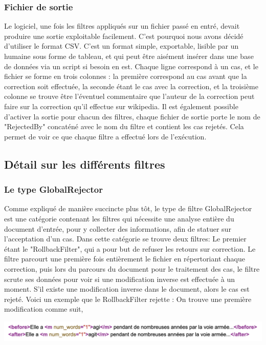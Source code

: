 \documentclass{article}
\begin{document}
\subsubsection{Fichier de sortie}
Le logiciel, une fois les filtres appliqu\'{e}s sur un fichier pass\'{e} en entr\'{e}, devait produire une sortie exploitable facilement. C'est pourquoi nous avons d\'{e}cid\'{e} d'utiliser le format CSV. C'est un format simple, exportable, lisible par un humaine sous forme de tableau, et qui peut \^{e}tre ais\'{e}ment ins\'{e}rer dans une base de donn\'{e}es via un script si besoin en est. Chaque ligne correspond \`{a} un cas, et le fichier se forme en trois colonnes : la premi\`{e}re correspond au cas avant que la correction soit effectu\'{e}e, la seconde \'{e}tant le cas avec la correction, et la troisi\`{e}me colonne se trouve \^{e}tre l'\'{e}ventuel commentaire que l'auteur de la correction peut faire sur la correction qu'il effectue sur wikipedia.
Il est \'{e}galement possible d'activer la sortie pour chacun des filtres, chaque fichier de sortie porte le nom de "RejectedBy" concat\'{e}n\'{e} avec le nom du filtre et contient les cas rejet\'{e}s. Cela permet de voir ce que chaque filtre a effectu\'{e} lors de l'ex\'{e}cution.

\subsection{D\'{e}tail sur les diff\'{e}rents filtres}
\subsubsection{Le type GlobalRejector}
Comme expliqu\'{e} de mani\`{e}re succincte plus t\^{o}t, le type de filtre GlobalRejector est une cat\'{e}gorie contenant les filtres qui n\'{e}cessite une analyse enti\`{e}re du document d'entr\'{e}e, pour y collecter des informations, afin de statuer sur l'acceptation d'un cas. 
	Dans cette cat\'{e}gorie se trouve deux filtres:
Le premier \'{e}tant le "RollbackFilter", qui a pour but de refuser les retours sur correction. Le filtre parcourt une premi\`{e}re fois enti\`{e}rement le fichier en r\'{e}pertoriant chaque correction, puis lors du parcours du document pour le traitement des cas, le filtre scrute ses donn\'{e}es pour voir si une modification inverse est effectu\'{e}e \`{a} un moment. S'il existe une modification inverse dans le document, alors le cas est rejet\'{e}.
Voici un exemple que le RollbackFilter rejette :
On trouve une premi\`{e}re modification comme suit,
\begin{center}
\includegraphics[width=14cm]{exemple10.png} %
\end{center}
\end{document}
